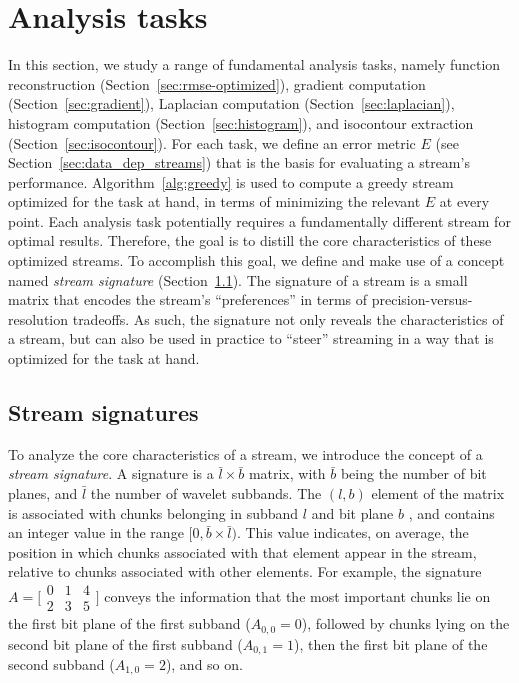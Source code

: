 \section{Analysis tasks}
\label{sec:analysis-tasks}

In this section, we study a range of fundamental analysis tasks, namely function reconstruction
(Section~\ref{sec:rmse-optimized}), gradient computation (Section~\ref{sec:gradient}), Laplacian
computation (Section~\ref{sec:laplacian}), histogram computation (Section~\ref{sec:histogram}), and
isocontour extraction (Section~\ref{sec:isocontour}). For each task, we define an error metric $E$
(see Section~\ref{sec:data_dep_streams}) that is the basis for evaluating a stream's performance.
Algorithm~\ref{alg:greedy} is used to compute a greedy stream optimized for the task at hand, in
terms of minimizing the relevant $E$ at every point. Each analysis task potentially requires a
fundamentally different stream for optimal results. Therefore, the goal is to distill the core
characteristics of these optimized streams. To accomplish this goal, we define and make use of a
concept named \emph{stream signature} (Section~\ref{sec:stream-signature}). The signature of a
stream is a small matrix that encodes the stream's ``preferences'' in terms of
precision-versus-resolution tradeoffs. As such, the signature not only reveals the characteristics
of a stream, but can also be used in practice to ``steer'' streaming in a way that is optimized for
the task at hand.

\subsection{Stream signatures}
\label{sec:stream-signature}

To analyze the core characteristics of a stream, we introduce the concept of a \emph{stream
signature}. A signature is a $\bar{l} \times \bar{b}$ matrix, with $\bar{b}$ being the number of bit
planes, and $\bar{l}$ the number of wavelet subbands. The $(l,b)$ element of the matrix is
associated with chunks belonging in subband $l$ and bit plane $b$ , and contains an integer value in
the range $[0,\bar{b}\times \bar{l})$. This value indicates, on average, the position in which
chunks associated with that element appear in the stream, relative to chunks associated with other
elements. For example, the signature  $A=\bigl[
\begin{smallmatrix}0 & 1 & 4\\ 2 & 3 & 5\end{smallmatrix}\bigr]$ conveys the information that the
most important chunks lie on the first bit plane of the first subband ($A_{0,0}=0$), followed by
chunks lying on the second bit plane of the first subband ($A_{0,1}=1$), then the first bit plane of
the second subband ($A_{1,0}=2$), and so on.

